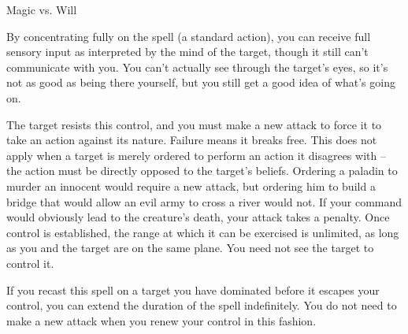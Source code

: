 \begin{spellcontent}
\begin{spelleffects}
\begin{spellattack}{Magic vs. Will}
            \par By concentrating fully on the spell (a standard action), you can receive full sensory input as interpreted by the mind of the target, though it still can't communicate with you. You can't actually see through the target's eyes, so it's not as good as being there yourself, but you still get a good idea of what's going on.
            \par The target resists this control, and you must make a new attack to force it to take an action against its nature. Failure means it breaks free. This does not apply when a target is merely ordered to perform an action it disagrees with -- the action must be directly opposed to the target's beliefs. Ordering a paladin to murder an innocent would require a new attack, but ordering him to build a bridge that would allow an evil army to cross a river would not. If your command would obviously lead to the creature's death, your attack takes a  penalty. Once control is established, the range at which it can be exercised is unlimited, as long as you and the target are on the same plane. You need not see the target to control it.
            \par If you recast this spell on a target you have dominated before it escapes your control, you can extend the duration of the spell indefinitely. You do not need to make a new attack when you renew your control in this fashion.
        \end{spellattack}
    \end{spelleffects}
\end{spellcontent}
\begin{spellfooter}

\end{spellfooter}

